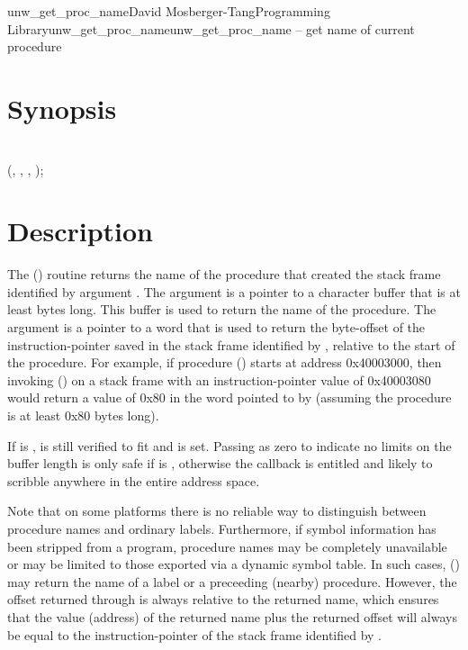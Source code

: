 \documentclass{article}
\begin{document}
\begin{Name}{3}{unw\_get\_proc\_name}{David Mosberger-Tang}{Programming Library}{unw\_get\_proc\_name}unw\_get\_proc\_name -- get name of current procedure
\end{Name}

\section{Synopsis}

\\

 (, ,  , );\\

\section{Description}

The () routine returns the name of the
procedure that created the stack frame identified by argument
.  The  argument is a pointer to a character buffer
that is at least  bytes long.  This buffer is used to return
the name of the procedure.  The  argument is a pointer to a
word that is used to return the byte-offset of the instruction-pointer
saved in the stack frame identified by , relative to the start
of the procedure.  For example, if procedure () starts at
address 0x40003000, then invoking () on a
stack frame with an instruction-pointer value of 0x40003080 would
return a value of 0x80 in the word pointed to by  (assuming
the procedure is at least 0x80 bytes long).

If  is ,  is still verified to fit
and  is set.  Passing  as zero to indicate no
limits on the buffer length is only safe if  is ,
otherwise the callback is entitled and likely to scribble anywhere in
the entire address space.

Note that on some platforms there is no reliable way to distinguish
between procedure names and ordinary labels.  Furthermore, if symbol
information has been stripped from a program, procedure names may be
completely unavailable or may be limited to those exported via a
dynamic symbol table.  In such cases, ()
may return the name of a label or a preceeding (nearby) procedure.
However, the offset returned through  is always relative to
the returned name, which ensures that the value (address) of the
returned name plus the returned offset will always be equal to the
instruction-pointer of the stack frame identified by .
\end{document}
